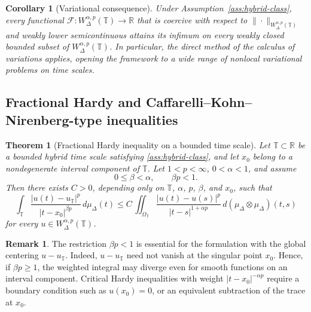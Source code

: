 \documentclass[11pt,a4paper]{article}
\numberwithin{equation}{section}
\newtheorem{theorem}{Theorem}[section]
\newtheorem{corollary}[corollary]{Corollary}
\theoremstyle{definition}
\newtheorem{remark}[remark]{Remark}
\newcommand{\R}{\mathbb{R}}
\newcommand{\T}{\mathbb{T}}
\begin{document}
\begin{corollary}[Variational consequence]\label{cor:variational}
Under Assumption~\ref{ass:hybrid-class}, every functional 
$\mathcal{F} : W^{\alpha,p}_\Delta(\mathbb{T}) \to \mathbb{R}$ that is coercive 
with respect to $\|\cdot\|_{W^{\alpha,p}_\Delta(\mathbb{T})}$ and weakly lower 
semicontinuous attains its infimum on every weakly closed bounded subset of 
$W^{\alpha,p}_\Delta(\mathbb{T})$. In particular, the direct method of the 
calculus of variations applies, opening the framework to a wide range of 
nonlocal variational problems on time scales.
\end{corollary}
\subsection{Fractional Hardy and Caffarelli--Kohn--Nirenberg-type
inequalities}
\label{subsec:hardy-ckn}

\begin{theorem}[Fractional Hardy inequality on a bounded time scale]
\label{thm:hardy}
Let $\T\subset\R$ be a bounded hybrid time scale satisfying
\cref{ass:hybrid-class}, and let $x_0$ belong to a nondegenerate interval
component of $\T$. Let $1<p<\infty$, $0<\alpha<1$, and assume
\[
0\le \beta<\alpha,\qquad \beta p<1.
\]
Then there exists $C>0$, depending only on $\T$, $\alpha$, $p$, $\beta$, and
$x_0$, such that
\begin{equation}\label{eq:hardy}
\int_{\T}
\frac{|u(t)-u_{\T}|^p}{|t-x_0|^{\beta p}}\,d\mu_\Delta(t)
\le
C\,\iint_{\Omega_{\T}}
\frac{|u(t)-u(s)|^p}{|t-s|^{1+\alpha p}}
\,d(\mu_\Delta\otimes\mu_\Delta)(t,s)
\end{equation}
for every $u\in W^{\alpha,p}_\Delta(\T)$.
\end{theorem}

\begin{remark}\label{rem:hardy-subcritical-necessary}
The restriction $\beta p<1$ is essential for the formulation with the global
centering $u-u_\T$. Indeed, $u-u_\T$ need not vanish at the singular point
$x_0$. Hence, if $\beta p\ge 1$, the weighted integral may diverge even for
smooth functions on an interval component. Critical Hardy inequalities with
weight $|t-x_0|^{-\alpha p}$ require a boundary condition such as
$u(x_0)=0$, or an equivalent subtraction of the trace at $x_0$.
\end{remark}
\end{document}
